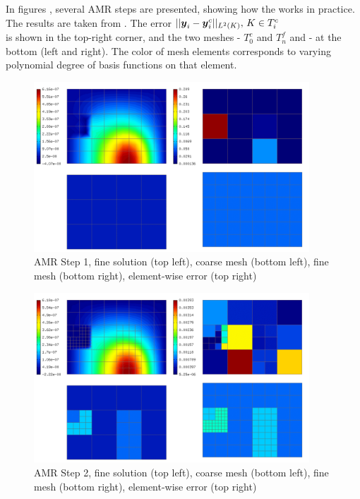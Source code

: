In figures , several AMR steps are presented, showing how the  works in practice. The results are taken from \cite{diplomka}. The error $||\mbox{\boldmath $y$}_i - \mbox{\boldmath $y$}_i^c||_{L^2\left( K\right)},\, K \in T_i^c$\\ is shown in the top-right corner, and the two meshes - $T_0^{c}$ and $T_n^{f}$ and - at the bottom (left and right). The color of mesh elements corresponds to varying polynomial degree of basis functions on that element.

\begin{figure}[H]
	\begin{center}
		\includegraphics[width=0.92\textwidth]{img/adapt/ref/1.jpg}
		\caption{AMR Step 1, fine solution (top left), coarse mesh (bottom left), fine mesh (bottom right), element-wise error (top right)}
	\label{figure:amrRef1}
	\end{center}
\end{figure}
\vspace{-4mm}
\begin{figure}[H]
	\begin{center}
		\includegraphics[width=0.92\textwidth]{img/adapt/ref/2.jpg}
		\caption{AMR Step 2, fine solution (top left), coarse mesh (bottom left), fine mesh (bottom right), element-wise error (top right)}
	\label{figure:amrRef2}
	\end{center}
\end{figure}
